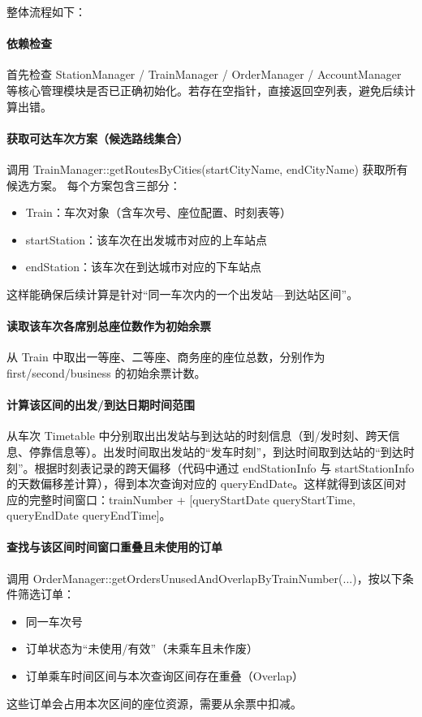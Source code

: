 \documentclass{article}
\begin{document}
			整体流程如下：
			
			\paragraph{依赖检查} 首先检查 StationManager / TrainManager / OrderManager / AccountManager 等核心管理模块是否已正确初始化。若存在空指针，直接返回空列表，避免后续计算出错。
			
			\paragraph{获取可达车次方案（候选路线集合）} 调用 TrainManager::getRoutesByCities(startCityName, endCityName) 获取所有候选方案。
			每个方案包含三部分：
			\begin{itemize}
			\item Train：车次对象（含车次号、座位配置、时刻表等）
			\item startStation：该车次在出发城市对应的上车站点
			\item endStation：该车次在到达城市对应的下车站点
			\end{itemize}
			这样能确保后续计算是针对“同一车次内的一个出发站—到达站区间”。
			
			\paragraph{读取该车次各席别总座位数作为初始余票} 从 Train 中取出一等座、二等座、商务座的座位总数，分别作为 first/second/business 的初始余票计数。
			
			\paragraph{计算该区间的出发/到达日期时间范围} 从车次 Timetable 中分别取出出发站与到达站的时刻信息（到/发时刻、跨天信息、停靠信息等）。出发时间取出发站的“发车时刻”，到达时间取到达站的“到达时刻”。根据时刻表记录的跨天偏移（代码中通过 endStationInfo 与 startStationInfo 的天数偏移差计算），得到本次查询对应的 queryEndDate。这样就得到该区间对应的完整时间窗口：trainNumber + [queryStartDate queryStartTime, queryEndDate queryEndTime]。
			
			\paragraph{查找与该区间时间窗口重叠且未使用的订单} 调用 OrderManager::getOrdersUnusedAndOverlapByTrainNumber(...)，按以下条件筛选订单：
			\begin{itemize}
			\item 同一车次号
			\item 订单状态为“未使用/有效”（未乘车且未作废）
			\item 订单乘车时间区间与本次查询区间存在重叠（Overlap）
			\end{itemize}
			这些订单会占用本次区间的座位资源，需要从余票中扣减。
			
\end{document}
